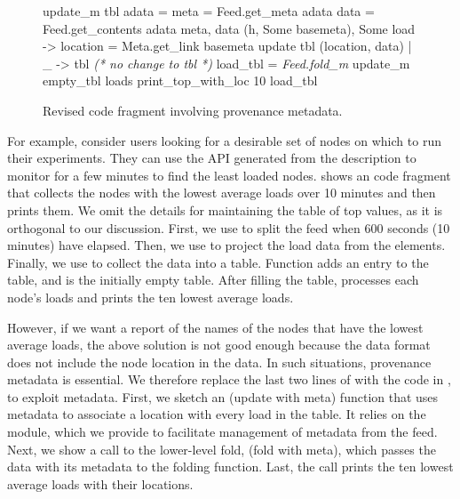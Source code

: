 \begin{figure}[tb]

\begin{codebox}
 update_m  tbl adata =
   meta = Feed.get_meta adata 
   data = Feed.get_contents adata 
   meta, data  
    (h, Some basemeta), Some load ->
       location = Meta.get_link basemeta 
      update tbl (location, data)
  | _ -> tbl \textit{ (* no change to tbl *)} 
 load_tbl = \textit{Feed.fold_m} update_m empty_tbl loads
 print_top_with_loc 10 load_tbl
\end{codebox}
  \caption{Revised code fragment involving provenance metadata. }
\label{fig:sample-loads-prov}
\end{figure}

For example, consider \planetlab users looking for a desirable set of
nodes on which to run their experiments. 
They can use the API generated from the \comon description 
to monitor \planetlab for a few
minutes to find the least loaded nodes. 
shows an \ocaml{} code fragment that collects the nodes with the
lowest average loads over 10 minutes and then prints them. 
We omit the details for maintaining the table of top values, as it is
orthogonal to our discussion. 
First, we use  to
split the feed when 600 seconds (10 minutes) have elapsed. Then, we
use  to project the load data from the \comon
elements. Finally, we use  to collect the data
into a table. Function  adds an entry to the table, and
 is the initially empty table.
After filling the table, 
processes each node's loads
and prints the ten lowest average loads.

However, if we want a report of the names of the nodes that have 
the lowest average loads, the above solution is not good enough
because the \comon data format does not include the node location in the data.
In such situations, provenance metadata is essential. 
We therefore replace the last two lines of
 with the code in
, to exploit metadata. First, we sketch an 
 (update with meta) function that uses
metadata to associate a location with every load in the table. It relies on the  module, 
which we provide to facilitate management of metadata from the feed. Next, 
we show a call to the lower-level fold,  (fold with meta), which passes the 
data with its metadata to the folding
function.  Last, the call  prints the ten 
lowest average loads with their locations.

